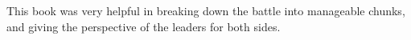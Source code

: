 This book was very helpful in breaking down the battle into manageable chunks,
and giving the perspective of the leaders for both sides.
